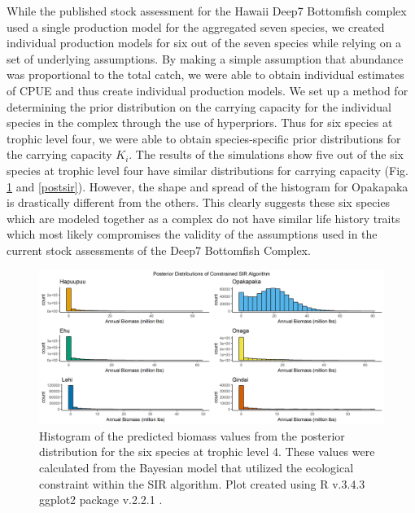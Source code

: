 \documentclass[oneside,12pt,final]{sty/ucthesis-CA2012}
\let\cite\citep                             %
\begin{document}
\begin{mainmatter}
\vspace{5mm}

While the published stock assessment for the Hawaii Deep7 Bottomfish complex used a single production model for the aggregated seven species, we created individual production models for six out of the seven species while relying on a set of underlying assumptions. By making a simple assumption that abundance was proportional to the total catch, we were able to obtain individual estimates of CPUE and thus create individual production models. We set up a method for determining the prior distribution on the carrying capacity for the individual species in the complex through the use of hyperpriors. Thus for six species at trophic level four, we were able to obtain species-specific prior distributions for the carrying capacity $K_i$. The results of the simulations show five out of the six species at trophic level four have similar distributions for carrying capacity (Fig. \ref{postconstsir} and \ref{postsir}). However, the shape and spread of the histogram for Opakapaka is drastically different from the others. This clearly suggests these six species which are modeled together as a complex do not have similar life history traits which most likely compromises the validity of the assumptions used in the current stock assessments of the Deep7 Bottomfish Complex. 

\begin{figure}[H]
     \centering
       \includegraphics[width=\textwidth]{fig/post_constrained_sir}
    \caption{Histogram of the predicted biomass values from the posterior distribution for the six species at trophic level 4. These values were calculated from the Bayesian model that utilized the ecological constraint within the SIR algorithm. Plot created using R v.3.4.3 \cite{Rcite} ggplot2 package v.2.2.1 \cite{ggplot}.}
    \label{postconstsir}
\end{figure}


\end{mainmatter}
\end{document}
